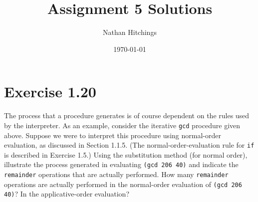 \documentclass[11pt]{article}
\author{Nathan Hitchings}
\date{\today}
\title{Assignment 5 Solutions}
\begin{document}
\maketitle
\section{Exercise 1.20}
\label{sec:org9d22b50}
The process that a procedure generates is of course dependent on the rules
used by the interpreter. As an example, consider the iterative \texttt{gcd} procedure
given above. Suppose we were to interpret this procedure using normal-order
evaluation, as discussed in Section 1.1.5. (The normal-order-evaluation rule
for \texttt{if} is described in Exercise 1.5.) Using the substitution method (for
normal order), illustrate the process generated in evaluating \texttt{(gcd 206 40)}
and indicate the \texttt{remainder} operations that are actually performed. How many
\texttt{remainder} operations are actually performed in the normal-order evaluation
of \texttt{(gcd 206 40)}? In the applicative-order evaluation?
\end{document}
